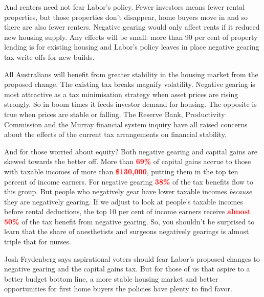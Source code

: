 \documentclass[b5paper,11pt]{article}\usepackage[]{graphicx}\usepackage[]{color}
\begin{document}
And renters need not fear Labor's policy. Fewer investors means fewer
rental properties, but those properties don't disappear, home buyers
move in and so there are also fewer renters. Negative gearing would only
affect rents if it reduced new housing supply. Any effects will be
small: more than 90 per cent of property lending is for existing housing
and Labor's policy leaves in place negative gearing tax write offs for
new builds.

All Australians will benefit from greater stability in the housing
market from the proposed change. The existing tax breaks magnify
volatility. Negative gearing is most attractive as a tax minimisation
strategy when asset prices are rising strongly. So in boom times it
feeds investor demand for housing. The opposite is true when prices are
stable or falling. The Reserve Bank, Productivity Commission and the
Murray financial system inquiry have all raised concerns about the
effects of the current tax arrangements on financial stability.

And for those worried about equity? Both negative gearing and capital
gains are skewed towards the better off. More than \textcolor{red}{\textbf{69\%}} of
capital gains accrue to those with taxable incomes of more than \textcolor{red}{\textbf{\$130,000}},
putting them in the top ten percent of income earners. For negative
gearing \textcolor{red}{\textbf{38\%}} of the tax benefits flow to this group. But people
who negatively gear have lower taxable incomes \emph{because} they are
negatively gearing. If we adjust to look at people's taxable incomes
before rental deductions, the top 10 per cent of income earners receive
\textcolor{red}{\textbf{almost 50\%}} of the tax benefit from negative gearing. So, you
shouldn't be surprised to learn that the share of anesthetists and
surgeons negatively gearings is almost triple that for nurses.

Josh Frydenberg says aspirational voters should fear Labor's proposed
changes to negative gearing and the capital gains tax. But for those of
us that aspire to a better budget bottom line, a more stable housing
market and better opportunities for first home buyers the policies have
plenty to find favor.
\end{document}
